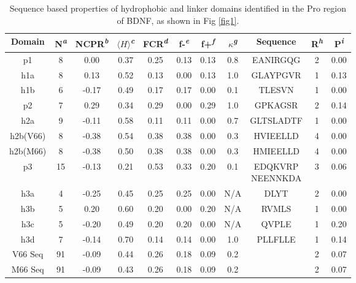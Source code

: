 \documentclass[10pt,letterpaper]{article}
\begin{document}
\begin{table}[!ht]
\begin{adjustwidth}{-2.25in}{0in} %
\centering
\caption{Sequence based properties of hydrophobic and linker domains identified in the Pro region of BDNF, as shown in Fig \ref{fig1}. }
\label{table1}
\begin{tabular}{|c|c|c|c|c|c|c|c|c|c|c|}
\hline
Domain & N\textsuperscript{\emph{a}} & NCPR\textsuperscript{\emph{b}} & $\langle H \rangle$\textsuperscript{\emph{c}} & FCR\textsuperscript{\emph{d}} & f-\textsuperscript{\emph{e}} & f+\textsuperscript{\emph{f}} & $\kappa$\textsuperscript{\emph{g}} & Sequence & R\textsuperscript{\emph{h}} & P\textsuperscript{\emph{i}} \\
\hline\hline
p1 & 8 & 0.00 & 0.37 & 0.25 & 0.13 & 0.13 & 0.8 &  EANIRGQG & 2 & 0.00\\
\hline
h1a & 8 & 0.13 & 0.52 & 0.13 & 0.00 & 0.13 & 1.0 &  GLAYPGVR & 1 & 0.13\\
\hline
h1b & 6 & -0.17 & 0.49 & 0.17 & 0.17 & 0.00 & 0.1 &  TLESVN & 1 & 0.00\\
\hline
p2 & 7 & 0.29 & 0.34 & 0.29 & 0.00 & 0.29 & 1.0 &  GPKAGSR & 2 & 0.14\\
\hline
h2a & 9 & -0.11 & 0.58 & 0.11 & 0.11 & 0.00 & 0.7 & GLTSLADTF & 1 & 0.00\\
\hline
h2b(V66) & 8 & -0.38 & 0.54 & 0.38 & 0.38 & 0.00 & 0.3 &  HVIEELLD & 4 & 0.00\\
\hline
h2b(M66) & 8 & -0.38 & 0.50 & 0.38 & 0.38 & 0.00 & 0.3 &  HMIEELLD & 4 & 0.00\\
\hline
p3 & 15 & -0.13 & 0.21 & 0.53 & 0.33 & 0.20 & 0.1 & \makecell{EDQKVRP \\ NEENNKDA} & 3 & 0.06\\
\hline
h3a & 4 & -0.25 & 0.45 & 0.25 & 0.25 & 0.00 & N/A &  DLYT & 2 & 0.00\\
\hline
h3b & 5 & 0.20 & 0.60 & 0.20 & 0.00 & 0.20 & N/A &  RVMLS & 1 & 0.00\\
\hline
h3c & 5 & -0.20 & 0.49 & 0.20 & 0.20 & 0.00 &N/A &  QVPLE & 1 & 0.20\\
\hline
h3d & 7 & -0.14 & 0.70 & 0.14 & 0.14 & 0.00 & 1.0 &  PLLFLLE & 1& 0.14\\
\hline\hline
V66 Seq  & 91 & -0.09 & 0.44 & 0.26 & 0.18 & 0.09 & 0.2 & & 2 &0.07 \\
\hline
M66 Seq & 91 & -0.09 & 0.43 & 0.26 & 0.18 & 0.09 & 0.2 & & 2 &0.07 \\
\hline
\end{tabular}

\end{adjustwidth}
\end{table}
\end{document}
